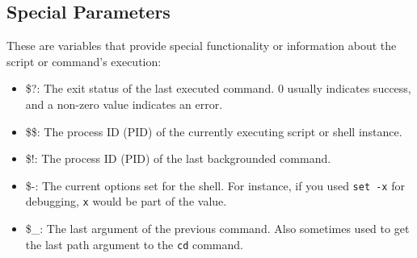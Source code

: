 \documentclass{report}
\begin{document}
    \subsection{Special Parameters}
    \bigbreak \noindent 
    These are variables that provide special functionality or information about the script or command's execution:
    \bigbreak \noindent 
    \begin{itemize}
        \item \$?: The exit status of the last executed command. \(0\) usually indicates success, and a non-zero value indicates an error.
        \item \$\$: The process ID (PID) of the currently executing script or shell instance.
        \item \$!: The process ID (PID) of the last backgrounded command.
        \item \$-: The current options set for the shell. For instance, if you used \texttt{set -x} for debugging, \texttt{x} would be part of the value.
        \item \$\_: The last argument of the previous command. Also sometimes used to get the last path argument to the \texttt{cd} command.
    \end{itemize}

    \bigbreak \noindent 
\end{document}

